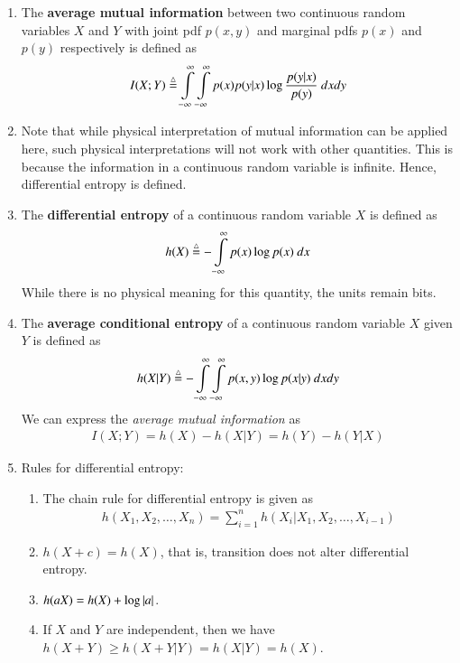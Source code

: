 \documentclass[journal,12pt,twocolumn]{IEEEtran}
\renewcommand\thesection{\arabic{section}}
\begin{document}
\begin{enumerate}[label=\thesection.\arabic*, ref=\thesection.\theenumi]
    \item The \textbf{average mutual information} between two continuous random 
    variables $X$ and $Y$ with joint pdf $p(x,y)$ and marginal pdfs $p(x)$ and 
    $p(y)$ respectively is defined as
    \begin{align}
        I(X;Y) \define \int\limits_{-\infty}^{\infty}\int\limits_{-\infty}^{\infty}p(x)p(y|x)\log\frac{p(y|x)}{p(y)}\ dxdy
        \label{eq:mutual-info-cont}
    \end{align}
    \item Note that while physical interpretation of mutual information can be
    applied here, such physical interpretations will not work with other 
    quantities. This is because the information in a continuous random variable
    is infinite. Hence, differential entropy is defined.
    \item The \textbf{differential entropy} of a continuous random variable $X$ 
    is defined as
    \begin{align}
        h(X) \stackrel{\triangle}{=} -\int\limits_{-\infty}^{\infty}p(x)\log p(x)\ dx
        \label{eq:diff-entropy}
    \end{align}
    While there is no physical meaning for this quantity, the units remain bits.
    \item The \textbf{average conditional entropy} of a continuous random variable 
    $X$ given $Y$ is defined as 
    \begin{align}
        h(X|Y) \stackrel{\triangle}{=} -\int\limits_{-\infty}^{\infty}\int\limits_{-\infty}^{\infty}p(x,y)\log p(x|y)\ dxdy
        \label{eq:avg-cond-entropy-cont}
    \end{align}
    We can express the \textit{average mutual information} as 
    \begin{align}
        I(X;Y) = h(X) - h(X|Y) = h(Y) - h(Y|X)
        \label{eq:mutual-self-cond-cont-eqn}
    \end{align}
    \item Rules for differential entropy:
    \begin{enumerate}[label=\theenumi.\arabic*, ref=\theenumi.\arabic*]
        \item The chain rule for differential entropy is given as 
        \begin{align}
            h(X_1,X_2,\ldots,X_n) = \sum_{i=1}^nh(X_i|X_1,X_2,\ldots,X_{i-1})
            \label{eq:chain-rule-cont}
        \end{align}
        \item $h(X + c) = h(X)$, that is, transition does not alter differential
        entropy.
        \item $h(aX) = h(X) + \log\left\vert a\right\vert$.
        \item If $X$ and $Y$ are independent, then we have $h(X+Y) \ge h(X+Y|Y) 
        = h(X|Y) = h(X)$.
    \end{enumerate}
\end{enumerate}
\end{document}
